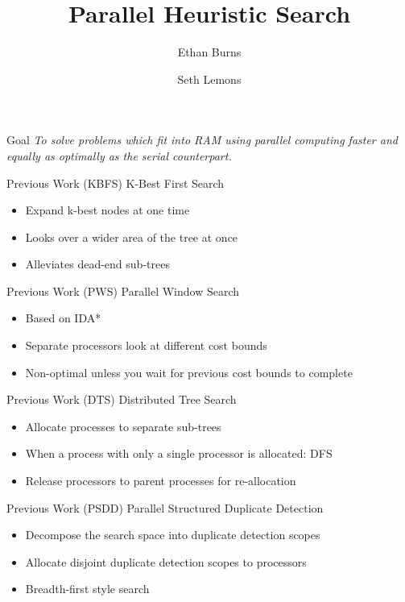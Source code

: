 \documentclass[style=simple]{powerdot}
\title{Parallel Heuristic Search}
\author{Ethan Burns \and Seth Lemons}
\begin{document}
\maketitle

\begin{slide}{Goal}
  \emph{To solve problems which fit into RAM using parallel computing
    faster and equally as optimally as the serial counterpart.}
\end{slide}

\begin{slide}{Previous Work (KBFS)}
  K-Best First Search
  \begin{itemize}
  \item Expand k-best nodes at one time
  \item Looks over a wider area of the tree at once
  \item Alleviates dead-end sub-trees
  \end{itemize}
\end{slide}

\begin{slide}{Previous Work (PWS)}
  Parallel Window Search
  \begin{itemize}
  \item Based on IDA*
  \item Separate processors look at different cost bounds
  \item Non-optimal unless you wait for previous cost bounds to complete
  \end{itemize}
\end{slide}

\begin{slide}{Previous Work (DTS)}
  Distributed Tree Search
  \begin{itemize}
  \item Allocate processes to separate sub-trees
  \item When a process with only a single processor is allocated: DFS
  \item Release processors to parent processes for re-allocation
  \end{itemize}
\end{slide}

\begin{slide}{Previous Work (PSDD)}
  Parallel Structured Duplicate Detection
  \begin{itemize}
  \item Decompose the search space into duplicate detection scopes
  \item Allocate disjoint duplicate detection scopes to processors
  \item Breadth-first style search
  \end{itemize}
\end{slide}
\end{document}
